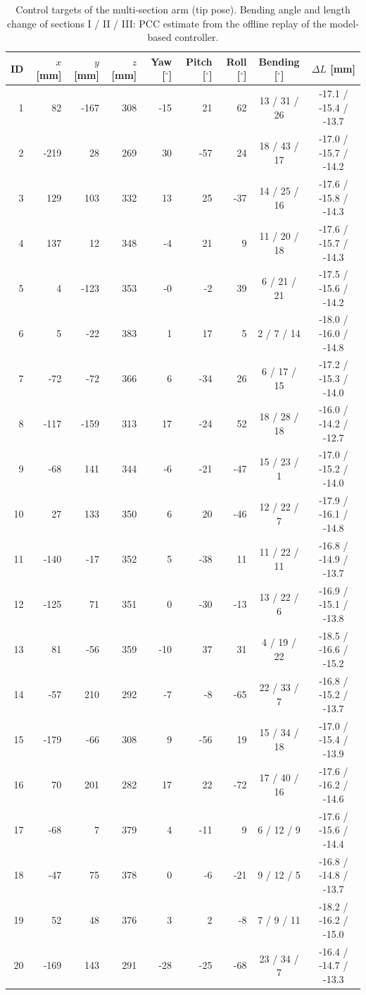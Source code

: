 \begin{table}[h]
\centering
\caption{Control targets of the multi-section arm (tip pose). Bending angle and length change of sections I / II / III: PCC estimate from the offline replay of the model-based controller.}
\label{tab:S9_targets_multi}
\begin{tabular}{rrrrrrrcc}
\toprule
ID & $x$ [mm] & $y$ [mm] & $z$ [mm] & Yaw [$^\circ$] & Pitch [$^\circ$] & Roll [$^\circ$] & Bending [$^\circ$] & $\Delta L$ [mm] \\
\midrule
1 & 82 & -167 & 308 & -15 & 21 & 62 & 13 / 31 / 26 & -17.1 / -15.4 / -13.7 \\
2 & -219 & 28 & 269 & 30 & -57 & 24 & 18 / 43 / 17 & -17.0 / -15.7 / -14.2 \\
3 & 129 & 103 & 332 & 13 & 25 & -37 & 14 / 25 / 16 & -17.6 / -15.8 / -14.3 \\
4 & 137 & 12 & 348 & -4 & 21 & 9 & 11 / 20 / 18 & -17.6 / -15.7 / -14.3 \\
5 & 4 & -123 & 353 & -0 & -2 & 39 & 6 / 21 / 21 & -17.5 / -15.6 / -14.2 \\
6 & 5 & -22 & 383 & 1 & 17 & 5 & 2 / 7 / 14 & -18.0 / -16.0 / -14.8 \\
7 & -72 & -72 & 366 & 6 & -34 & 26 & 6 / 17 / 15 & -17.2 / -15.3 / -14.0 \\
8 & -117 & -159 & 313 & 17 & -24 & 52 & 18 / 28 / 18 & -16.0 / -14.2 / -12.7 \\
9 & -68 & 141 & 344 & -6 & -21 & -47 & 15 / 23 / 1 & -17.0 / -15.2 / -14.0 \\
10 & 27 & 133 & 350 & 6 & 20 & -46 & 12 / 22 / 7 & -17.9 / -16.1 / -14.8 \\
11 & -140 & -17 & 352 & 5 & -38 & 11 & 11 / 22 / 11 & -16.8 / -14.9 / -13.7 \\
12 & -125 & 71 & 351 & 0 & -30 & -13 & 13 / 22 / 6 & -16.9 / -15.1 / -13.8 \\
13 & 81 & -56 & 359 & -10 & 37 & 31 & 4 / 19 / 22 & -18.5 / -16.6 / -15.2 \\
14 & -57 & 210 & 292 & -7 & -8 & -65 & 22 / 33 / 7 & -16.8 / -15.2 / -13.7 \\
15 & -179 & -66 & 308 & 9 & -56 & 19 & 15 / 34 / 18 & -17.0 / -15.4 / -13.9 \\
16 & 70 & 201 & 282 & 17 & 22 & -72 & 17 / 40 / 16 & -17.6 / -16.2 / -14.6 \\
17 & -68 & 7 & 379 & 4 & -11 & 9 & 6 / 12 / 9 & -17.6 / -15.6 / -14.4 \\
18 & -47 & 75 & 378 & 0 & -6 & -21 & 9 / 12 / 5 & -16.8 / -14.8 / -13.7 \\
19 & 52 & 48 & 376 & 3 & 2 & -8 & 7 / 9 / 11 & -18.2 / -16.2 / -15.0 \\
20 & -169 & 143 & 291 & -28 & -25 & -68 & 23 / 34 / 7 & -16.4 / -14.7 / -13.3 \\
\bottomrule
\end{tabular}
\end{table}

